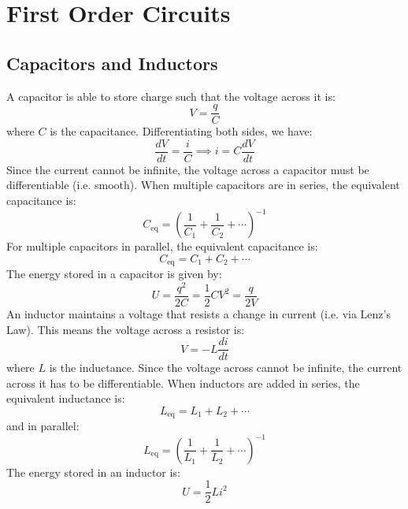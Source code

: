 \documentclass{article}
\begin{document}
\section{First Order Circuits}
\subsection{Capacitors and Inductors}
A capacitor is able to store charge such that the voltage across it is:
\begin{equation}
    V = \frac{q}{C}
\end{equation}
where $C$ is the capacitance. Differentiating both sides, we have:
\begin{equation}
    \frac{dV}{dt} = \frac{i}{C} \implies i = C\frac{dV}{dt}
\end{equation}
Since the current cannot be infinite, the voltage across a capacitor must be differentiable (i.e. smooth). When multiple capacitors are in series, the equivalent capacitance is:
\begin{equation}
    C_\text{eq} = \left(\frac{1}{C_1}+\frac{1}{C_2} + \cdots\right)^{-1}
\end{equation}
For multiple capacitors in parallel, the equivalent capacitance is:
\begin{equation}
    C_\text{eq} = C_1+C_2+\cdots
\end{equation}
The energy stored in a capacitor is given by:
\begin{equation}
    U = \frac{q^2}{2C} = \frac{1}{2}CV^2 = \frac{q}{2V}
\end{equation}
An inductor maintains a voltage that resists a change in current (i.e. via Lenz's Law). This means the voltage across a resistor is:
\begin{equation}
    V = -L\frac{di}{dt}
\end{equation}
where $L$ is the inductance. Since the voltage across cannot be infinite, the current across it has to be differentiable. When inductors are added in series, the equivalent inductance is:
\begin{equation}
    L_\text{eq} = L_1 + L_2 + \cdots
\end{equation}
and in parallel:
\begin{equation}
    L_\text{eq} = \left(\frac{1}{L_1} + \frac{1}{L_2}+\cdots\right)^{-1}
\end{equation}
The energy stored in an inductor is:
\begin{equation}
    U = \frac{1}{2}Li^2
\end{equation}
\end{document}
